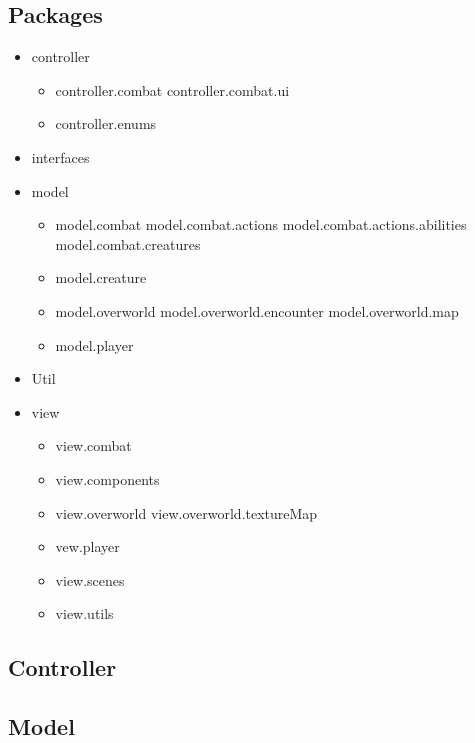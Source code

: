 \subsection{Packages}
\begin{itemize}
	\item controller
	      \begin{itemize}
		      \item controller.combat
		            \subitem controller.combat.ui
		      \item controller.enums
	      \end{itemize}
	\item interfaces
	\item model
	      \begin{itemize}
		      \item model.combat
		            \subitem model.combat.actions
		            \subitem model.combat.actions.abilities
		            \subitem model.combat.creatures
		      \item model.creature
		      \item model.overworld
		            \subitem model.overworld.encounter
		            \subitem model.overworld.map
		      \item model.player
	      \end{itemize}
	\item Util
	\item view
	      \begin{itemize}
		      \item view.combat
		      \item view.components
		      \item view.overworld
		            \subitem view.overworld.textureMap
		      \item vew.player
		      \item view.scenes
		      \item view.utils
	      \end{itemize}
\end{itemize}

\subsection{Controller}
\label{controller}

\subsection{Model}
\label{model}

